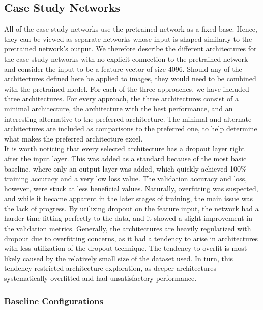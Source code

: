 \subsection{Case Study Networks} \label{sec:case-networks}

All of the case study networks use the pretrained network as a fixed base. Hence, they can be viewed as separate networks whose input is shaped similarly to the pretrained network's output. We therefore describe the different architectures for the case study networks with no explicit connection to the pretrained network and consider the input to be a feature vector of size 4096. Should any of the architectures defined here be applied to images, they would need to be combined with the pretrained model. For each of the three approaches, we have included three architectures. For every approach, the three architectures consist of a minimal architecture, the architecture with the best performance, and an interesting alternative to the preferred architecture. The minimal and alternate architectures are included as comparisons to the preferred one, to help determine what makes the preferred architecture excel. \\

\noindent It is worth noticing that every selected architecture has a dropout layer right after the input layer. This was added as a standard because of the most basic baseline, where only an output layer was added, which quickly achieved 100\% training accuracy and a very low loss value. The validation accuracy and loss, however, were stuck at less beneficial values. Naturally, overfitting was suspected, and while it became apparent in the later stages of training, the main issue was the lack of progress. By utilizing dropout on the feature input, the network had a harder time fitting perfectly to the data, and it showed a slight improvement in the validation metrics. Generally, the architectures are heavily regularized with dropout due to overfitting concerns, as it had a tendency to arise in architectures with less utilization of the dropout technique. The tendency to overfit is most likely caused by the relatively small size of the dataset used. In turn, this tendency restricted architecture exploration, as deeper architectures systematically overfitted and had unsatisfactory performance. \\

\subsubsection{Baseline Configurations}

